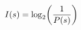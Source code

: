 \documentclass[preview]{standalone}
\begin{document}
\begin{align*}
\special{dvisvgm:raw <g id='unique000'>}I(s) = \log_2\!\left(\frac{1}{P(s)}\right)\special{dvisvgm:raw </g>}
\end{align*}
\end{document}
